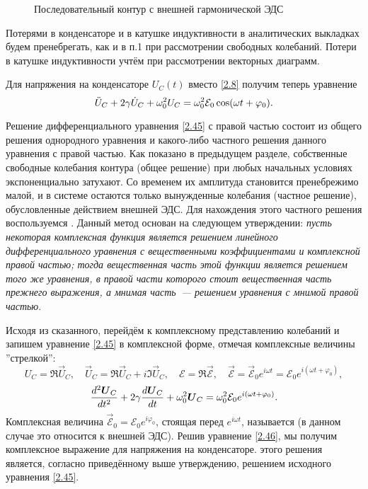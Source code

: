 \begin{figure}[h!]
	\centering
	\caption{Последовательный контур с внешней гармонической ЭДС}
\end{figure}

Потерями в конденсаторе и в катушке индуктивности в аналитических выкладках
будем пренебрегать, как и в п.1 при рассмотрении свободных колебаний. Потери в
катушке индуктивности учтём при рассмотрении векторных диаграмм.

Для напряжения на конденсаторе $U_C(t)$ вместо \eqref{2.8} получим теперь
уравнение
\begin{equation}\eqmark{2.45}
\ddot{U}_C+2\gamma \dot{U}_C+\omega_0^2U_C=\omega_0^2\mathcal{E}_0\cos(\omega t+
\varphi_0).
\end{equation}


Решение  дифференциального уравнения \eqref{2.45} с правой
частью состоит из общего решения однородного уравнения и какого-либо частного
решения данного уравнения с правой частью. Как показано в предыдущем разделе,
собственные свободные колебания контура (общее решение) при любых начальных
условиях экспоненциально затухают. Со временем их амплитуда становится
пренебрежимо малой, и в системе остаются только вынужденные колебания (частное
решение), обусловленные действием внешней ЭДС. Для нахождения этого частного
решения воспользуемся . Данный метод
основан на следующем утверждении: \emph{пусть некоторая комплексная функция
является решением линейного дифференциального уравнения с вещественными
коэффициентами и комплексной правой частью; тогда вещественная часть этой
функции является решением того же уравнения, в правой части которого стоит
вещественная часть прежнего выражения, а мнимая часть~--- решением уравнения с
мнимой правой частью}.

Исходя из сказанного, перейдём к комплексному представлению колебаний и запишем
уравнение \eqref{2.45} в комплексной форме, отмечая комплексные величины
''стрелкой'':
\begin{equation*}
U_C=\Re \vec U_C, \quad \vec U_C=\Re \vec U_C+i\Im \vec U_C, \quad
\mathcal{E}=\Re \vec{\mathcal{E}}, \quad \vec{\mathcal{E}}=
\vec{\mathcal{E}}_0e^{i\omega t}=\mathcal{E}_0e^{i(\omega t+\varphi_0)},
\end{equation*}
\begin{equation}\eqmark{2.46}
\dfrac{d^2\vec U_C}{dt^2}+2\gamma\dfrac{d\vec U_C}{dt}+\omega_0^2\vec
U_C=\omega_0^2\mathcal{E}_0e^{i(\omega t+\varphi_0)}.
\end{equation}
Комплексная величина $\vec{\mathcal{E}}_0=\mathcal{E}_0e^{i\varphi_0}$, стоящая
перед $e^{i\omega t}$, называется  (в данном
случае это относится к внешней ЭДС). Решив уравнение \eqref{2.46}, мы получим
комплексное выражение для напряжения на конденсаторе.  этого решения является, согласно приведённому выше утверждению, решением
исходного уравнения \eqref{2.45}.

